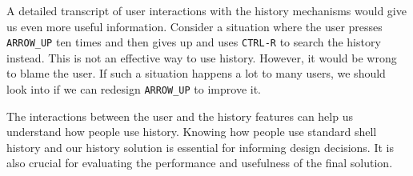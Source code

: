 

A detailed transcript of user interactions with the history mechanisms would give us even more useful information. Consider a situation where the user presses \verb|ARROW_UP| ten times and then gives up and uses \verb|CTRL-R| to search the history instead. This is not an effective way to use history. However, it would be wrong to blame the user. If such a situation happens a lot to many users, we should look into if we can redesign \verb|ARROW_UP| to improve it.

The interactions between the user and the history features can help us understand how people use history. Knowing how people use standard shell history and our history solution is essential for informing design decisions. It is also crucial for evaluating the performance and usefulness of the final solution. %
